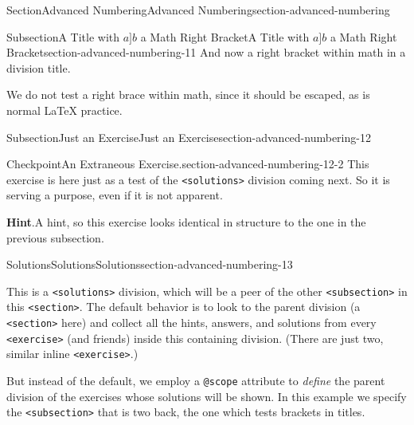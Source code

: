 \documentclass[twoside,10pt,]{article}
\newcommand{\blocktitlefont}{\relax}
\newcommand{\mono}[1]{\texttt{#1}}
\numberwithin{equation}{section}
\begin{document}
\begin{sectionptx}{Section}{Advanced Numbering}{}{Advanced Numbering}{}{}{section-advanced-numbering}
%
%
\typeout{************************************************}
\typeout{Subsection 31.9 A Title with \(a]b\) a Math Right Bracket}
\typeout{************************************************}
%
\begin{subsectionptx}{Subsection}{A Title with \(a]b\) a Math Right Bracket}{}{A Title with \(a]b\) a Math Right Bracket}{}{}{section-advanced-numbering-11}
And now a right bracket within math in a division title.%
\par
We do not test a right brace within math, since it should be escaped, as is normal \LaTeX{} practice.%
\end{subsectionptx}
%
%
\typeout{************************************************}
\typeout{************************************************}
%
\begin{subsectionptx}{Subsection}{Just an Exercise}{}{Just an Exercise}{}{}{section-advanced-numbering-12}
\begin{inlineexercise}{Checkpoint}{An Extraneous Exercise.}{section-advanced-numbering-12-2}%
This exercise is here just as a test of the \mono{<solutions>} division coming next.  So it is serving a purpose, even if it is not apparent.%
\par\smallskip%
\noindent\textbf{\blocktitlefont Hint}.\hypertarget{section-advanced-numbering-12-2-3}{}\quad{}A hint, so this exercise looks identical in structure to the one in the previous subsection.%
\end{inlineexercise}%
\end{subsectionptx}
%
%
\typeout{************************************************}
\typeout{************************************************}
%
\begin{solutions-subsection}{Solutions}{Solutions}{}{Solutions}{}{}{section-advanced-numbering-13}
\begin{introduction}{}%
This is a \mono{<solutions>} division, which will be a peer of the other \mono{<subsection>} in this \mono{<section>}. The default behavior is to look to the parent division (a \mono{<section>} here) and collect all the hints, answers, and solutions from every \mono{<exercise>} (and friends) inside this containing division.  (There are just two, similar inline \mono{<exercise>}.)%
\par
But instead of the default, we employ a \mono{@scope} attribute to \emph{define} the parent division of the exercises whose solutions will be shown.  In this example we specify the  \mono{<subsection>} that is two back, the one which tests brackets in titles.%

\end{introduction}
\end{solutions-subsection}
\end{sectionptx}
\end{document}
